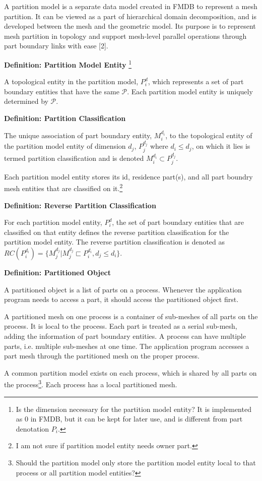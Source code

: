 
A partition model is a separate data model created in FMDB to represent
a mesh partition. It can be viewed as a part of hierarchical domain
decomposition, and is developed between the mesh and the geometric
model. Its purpose is to represent mesh partition in topology and
support mesh-level parallel operations through part boundary links
with ease [2]. 

\textbf{Definition: Partition Model Entity} \footnote{Is the
  dimension necessary for the partition model entity? It is
  implemented as 0 in FMDB, but it can be kept
  for later use, and is different from part denotation $P_i$. }  

A topological entity in the partition model, $P^d_i$, which represents a set of part boundary entities that have the
  same $\mathcal{P}$. Each partition model entity is uniquely
  determined by $\mathcal{P}$.   

\textbf{Definition: Partition Classification}

The unique association of part boundary entity, $M^{d_i}_i$, to the topological
entity of the partition model entity of dimension $d_j$, $P^{d_j}_j$ where
$d_i\leq d_j$, on which it lies is termed partition classification and
is denoted $M^{d_i}_i \subset P^{d_j}_j$.


Each partition model entity stores its id, residence
part(s), and all part boundry mesh entities that are
classified on it.\footnote{I am not sure if partition model entity
  needs owner part.}

\textbf{Definition: Reverse Partition Classification}

For each partition model entity, $P^d_i$, the set of part boundary entities
that are classified on that entity defines the
reverse partition classification for the partition model entity. The
reverse partition classification is denoted as $RC(P^{d_i}_i)=\{M^{d_j}_j|M^{d_j}_j
\sqsubset P^{d_i}_i,{d_j} \leq {d_i}\}$.


\textbf{Definition: Partitioned Object}

A partitioned object is a list of parts on a process. Whenever the
application program needs to access a part, it should access the
partitioned object first.  

A partitioned mesh on one process is a container of sub-meshes of all
parts on the process. It is local to the process. Each part is treated
as a serial sub-mesh, adding the information of part
boundary entities. A process can have multiple parts, i.e. multiple
sub-meshes at one time. The application
program accesses a part mesh through the partitioned mesh on the proper process.   

A common partition model exists on each process, which is shared by
all parts on the process\footnote{Should the partition model only
  store the partition model entity local to that process or all
  partition model entities?}. Each process has a local partitioned mesh.      
